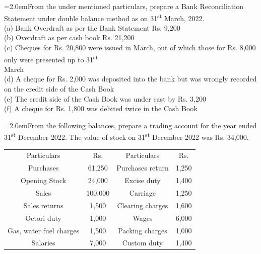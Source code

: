 \documentclass[11pt,a4paper]{article}
\newcommand{\lqn}[2]{\Needspace{6\baselineskip}\par\medskip\noindent\hangindent=2.0em\hangafter=1\makebox[2.0em][l]{\textbf{#1.}}#2\par}
\begin{document}
\lqn{80}{From the under mentioned particulars, prepare a Bank Reconciliation Statement under double balance method as on 31\textsuperscript{st} March, 2022.\\
(a) Bank Overdraft as per the Bank Statement Rs. 9,200\\
(b) Overdraft as per cash book Rs. 21,200\\
(c) Cheques for Rs. 20,800 were issued in March, out of which those for Rs. 8,000 only were presented up to 31\textsuperscript{st}\\
 March\\
(d) A cheque for Rs. 2,000 was deposited into the bank but was wrongly recorded on the credit side of the Cash Book\\
(e) The credit side of the Cash Book was under cast by Rs. 3,200\\
(f) A cheque for Rs. 1,800 was debited twice in the Cash Book\par
}
\lqn{81}{From the following balances, prepare a trading account for the year ended 31\textsuperscript{st} December 2022. The value of stock on 31\textsuperscript{st} December 2022 was Rs. 34,000.\par
\par\smallskip\noindent\hspace*{1.2em}\begin{tabular}{|cccc|}
\hline
Particulars & Rs. & Particulars & Rs. \\
Purchases & 61,250 & Purchases return & 1,250 \\
Opening Stock & 24,000 & Excise duty & 1,400 \\
Sales & 100,000 & Carriage & 1,250 \\
Sales returns & 1,500 & Clearing charges & 1,600 \\
Octori duty & 1,000 & Wages & 6,000 \\
Gas, water fuel charges & 1,500 & Packing charges & 1,000 \\
Salaries & 7,000 & Custom duty & 1,400 \\
\hline
\end{tabular}\par\smallskip
}
\end{document}
